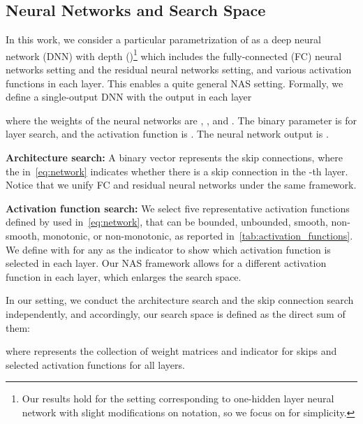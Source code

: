 \documentclass[nohyperref]{article}
\theoremstyle{plain}
\theoremstyle{definition}
\theoremstyle{remark}
\begin{document}
\subsection{Neural Networks and Search Space}
\label{ssec:search_space}

In this work, we consider a particular parametrization of  as a deep neural network (DNN) with depth  ()\footnote{Our results hold for the  setting corresponding to one-hidden layer neural network with slight modifications on notation, so we focus on  for simplicity.} which includes the fully-connected (FC) neural networks setting and the residual neural networks setting, and various activation functions in each layer. This enables a quite general NAS setting.
Formally, we define a single-output DNN with the output  in each layer

where the weights of the neural networks are , ,  and . The binary parameter  is for layer search, and the activation function is . 
The neural network output is .

{\bf Architecture search:} A binary vector  represents the skip connections, where the  in~\cref{eq:network} indicates whether there is a skip connection in the -th layer.
Notice that we unify FC and residual neural networks under the same framework.

{\bf Activation function search:} 
We select five representative activation functions defined by  used in~\cref{eq:network},  that can be bounded, unbounded, smooth, non-smooth, monotonic, or non-monotonic, as reported in~\cref{tab:activation_functions}.
We define  with  for any  as the indicator to show which activation function is selected in each layer.
Our NAS framework allows for a different activation function in each layer, which enlarges the search space.




 
In our setting, we conduct the architecture search and the skip connection search independently, and accordingly, our search space is defined as the direct sum of them:

where  represents the collection of weight matrices and indicator for skips and selected activation functions for all layers.
\end{document}
